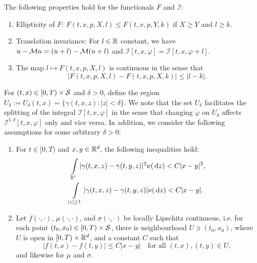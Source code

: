 \begin{remark}
\label{remark: Remark 5.1 in Seydel}
    The following properties hold for the functionals $F$ and $\mathcal I$:
    \begin{enumerate}[label=(\textup{P}\arabic*), ref=(\textup{P}\arabic*)]
        \item \label{ass: P1} Ellipticity of $F$: $F(t,x,p,X,l) \leq F(t,x,p,Y,k)$ if $X \geq Y$ and $l \geq k$.
        \item \label{ass: P2} Translation invariance: For $l \in \mathbb{R}$ constant, we have $u - \mathcal{M} u = (u+l)- \mathcal{M} (u+l)$ and $\mathcal{I}[t,x,\varphi] = \mathcal{I}[t,x,\varphi + l]$. 
        \item \label{ass: P3} The map $l \mapsto F(t,x,p,X,l)$ is continuous in the sense that
        \begin{equation*}
            \big|F(t,x,p,X,l) - F(t,x,p,X,k)\big| \leq |l-k|. 
        \end{equation*}
    \end{enumerate}
\end{remark}

For $(t,x) \in [0,T) \times \mathcal{S}$ and $\delta > 0$, define the region $U_\delta := U_\delta (t,x) = \{ \gamma (t,x,z): |z| < \delta \}$. We note that the set $U_\delta$ facilitates the splitting of the integral $\mathcal{I}[t,x,\varphi]$ in the sense that changing $\varphi$ on $U_\delta$ affects $\mathcal{I}^{1,\delta}[t,x,\varphi]$ only and vice versa. In addition, we consider the following assumptions for some arbitrary $\delta > 0$:

\begin{assumption}
    \label{ass: Assumption 2.4 in Seydel}
    \begin{enumerate}[label=(\textup{B}\arabic*), ref=(\textup{B}\arabic*)]
        \item \label{ass: B1} For $t \in [0,T)$ and $x,y \in \mathbb{R}^d$, the following inequalities hold: 
            \begin{align*}
                \int\limits_{\mathbb R^\ell} |\gamma (t,x,z) - \gamma (t,y,z)|^2 \nu(\,\mathrm{d} z) < C|x-y|^2 &, \\
                \int\limits_{|z|\geq 1} |\gamma (t,x,z) - \gamma (t,y,z)| \nu(\,\mathrm{d} z) < C|x-y|.
            \end{align*}
        \item \label{ass: B2} Let $f(\cdot, \cdot)$, $\mu(\cdot, \cdot)$, and $\sigma(\cdot, \cdot)$ be locally Lipschitz continuous, i.e. for each point $(t_0,x_0) \in [0,T) \times \mathcal{S}$, there is neighbourhood $U \ni (t_0,x_0)$, where $U$ is open in $[0,T) \times \mathbb{R}^d$, and a constant $C$ such that 
        \begin{equation*}
            |f(t,x) - f(t,y)| \leq C|x-y| \quad \text{for all } (t,x), (t,y) \in U,
        \end{equation*}
        and likewise for $\mu$ and $\sigma$.
    \end{enumerate}
\end{assumption}

